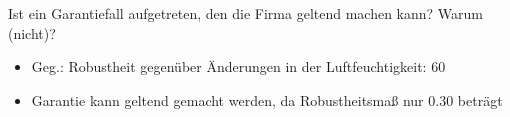 \documentclass{ocbeameruni}
\begin{document}
\begin{frame}{3.6}
Ist ein Garantiefall aufgetreten, den die Firma geltend machen kann? Warum (nicht)?
    \begin{itemize}
    \item Geg.: Robustheit gegenüber Änderungen in der Luftfeuchtigkeit: 60 %
    \item Garantie kann geltend gemacht werden, da Robustheitsmaß nur 0.30 beträgt
    \end{itemize}
\end{frame}
\end{document}
